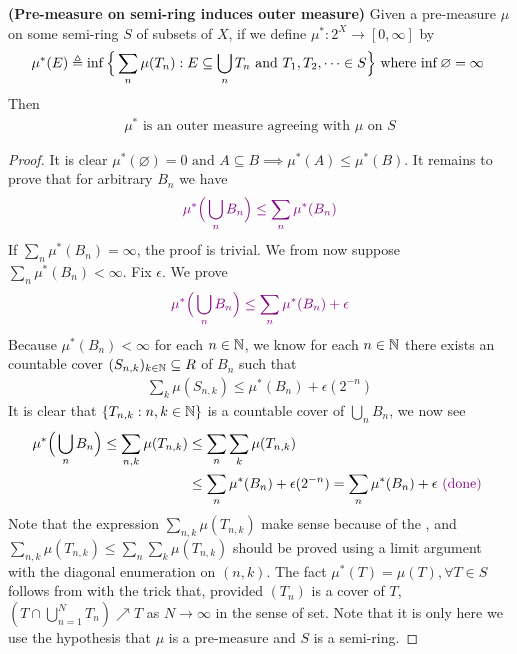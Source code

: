 \documentclass{report}
\begin{document}
\begin{theorem}
\label{Piom}
\textbf{(Pre-measure on semi-ring induces outer measure)} Given a pre-measure $\mu$ on some semi-ring $S$ of subsets of $X$, if we define $\mu^*:2^X\rightarrow [0,\infty]$ by
\begin{align*}
\mu^*(E)\triangleq \inf \Big\{ \sum_n \mu (T_n):E \subseteq \bigcup _n T_n\text{ and }T_1,T_2,\dots \in S \Big\}\text{ where $\inf \varnothing= \infty$ }
\end{align*}
Then 
\begin{align*}
\mu^*\text{ is an outer measure agreeing with $\mu$ on $S$}
\end{align*}
\end{theorem}
\begin{proof}
  It is clear $\mu^*(\varnothing)=0\text{ and }A\subseteq B \implies \mu^*(A)\leq \mu^*(B)$. It remains to prove that for arbitrary $B_n$ we have 
\begin{align*}
  \textcolor{violet}{\mu^* \Big(\bigcup_n B_n \Big)  \leq \sum_n \mu^* (B_n)}
\end{align*}
If  $\sum_n \mu^*(B_n)=\infty$, the proof is trivial. We from now suppose $\sum_n \mu^*(B_n)< \infty$. Fix $\epsilon $. We prove 
\begin{align*}
  \textcolor{violet}{\mu^*\Big(\bigcup _n B_n \Big)\leq \sum_n \mu^* (B_n)+\epsilon }
\end{align*}
Because $\mu^*(B_n)<\infty$ for each $n\in\mathbb{N}$, we know for each $n\in\mathbb{N}$ there exists an countable cover $(S_{n,k})_{k\in\mathbb{N}}\subseteq R$ of $B_n$ such that 
\begin{align*}
\sum_k \mu (S_{n,k}) \leq \mu^*(B_n)+\epsilon (2^{-n}) 
\end{align*}
It is clear that  $\{ T_{n,k}:n,k \in\mathbb{N} \}$ is a countable cover of $\bigcup_n B_n$, we now see 
\begin{align*}
  \mu^*\Big(\bigcup_n B_n \Big)\leq \sum_{n,k} \mu (T_{n,k})&\leq \sum_n \sum_k \mu(T_{n,k})\\
&\leq \sum_n \mu^*(B_n)+ \epsilon (2^{-n})= \sum_n \mu^*(B_n)+ \epsilon \textcolor{violet}{\text{ (done) }}
\end{align*}
Note that the expression $\sum_{n,k} \mu (T_{n,k})$ make sense because of the , and $\sum_{n,k}\mu (T_{n,k})\leq \sum_{n} \sum_{k} \mu (T_{n,k})$ should be proved using a limit argument with the diagonal enumeration on $(n,k)$. The fact $\mu^*(T)=\mu (T),\forall T \in S$ follows from  with the trick that, provided $(T_n)$ is a cover of $T$, $(T\cap \bigcup_{n=1}^N T_n)\nearrow T$ as $N\to \infty$ in the sense of set. Note that it is only here we use the hypothesis that $\mu$ is a pre-measure and $S$ is a semi-ring.   
\end{proof}
\end{document}
